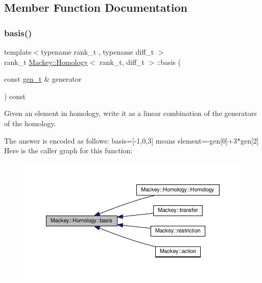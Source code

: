 \subsection{Member Function Documentation}
\mbox{\label{classMackey_1_1Homology_a2e6fb6da3abdba934a1eb2f4236623cb}} 
\subsubsection{\texorpdfstring{basis()}{basis()}}
{\footnotesize\ttfamily template$<$typename rank\+\_\+t , typename diff\+\_\+t $>$ \\
rank\+\_\+t \hyperlink{classMackey_1_1Homology}{Mackey\+::\+Homology}$<$ rank\+\_\+t, diff\+\_\+t $>$\+::basis (\begin{DoxyParamCaption}\item[{const \hyperlink{classMackey_1_1Homology_adf81f4293a5feba94aa734fcc8c89a46}{gen\+\_\+t} \&}]{generator }\end{DoxyParamCaption}) const}



Given an element in homology, write it as a linear combination of the generators of the homology. 

The answer is encoded as follows\+: basis=\mbox{[}-\/1,0,3\mbox{]} means element=-\/gen\mbox{[}0\mbox{]}+3$\ast$gen\mbox{[}2\mbox{]} Here is the caller graph for this function\+:\nopagebreak
\begin{figure}[H]
\begin{center}
\leavevmode
\includegraphics[width=350pt]{classMackey_1_1Homology_a2e6fb6da3abdba934a1eb2f4236623cb_icgraph}
\end{center}
\end{figure}
\mbox{\label{classMackey_1_1Homology_aeb3cbf5cc7cb166e8e0a552dda57d05b}} 
